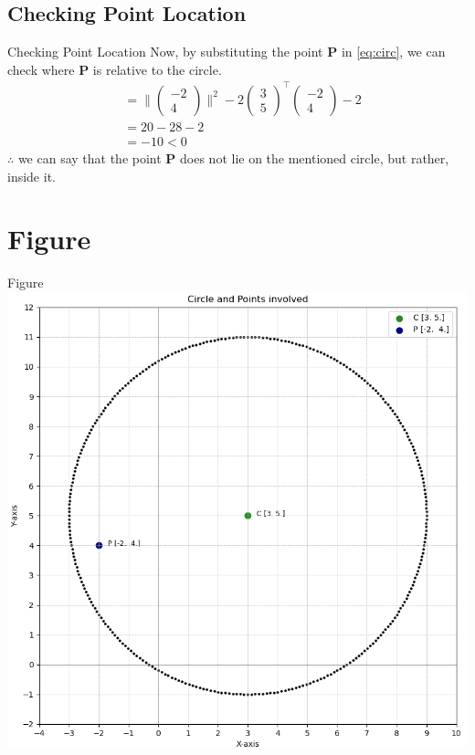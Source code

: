 \documentclass{beamer}
\theoremstyle{remark}
\providecommand{\norm}[1]{\lVert#1\rVert}
\newcommand{\myvec}[1]{\ensuremath{\begin{pmatrix}#1\end{pmatrix}}}
\let\vec\mathbf
\numberwithin{equation}{section}
\begin{document}
\subsection{Checking Point Location}
\begin{frame}{Checking Point Location}
    Now, by substituting the point $\vec{P}$ in \eqref{eq:circ}, we can check where $\vec{P}$ is relative to the circle.
    \begin{align}
        &= \norm{\myvec{-2\\4}}^2-2\myvec{3\\5}^\top\myvec{-2\\4}-2\\
        &= 20-28-2\\
        &= -10 < 0
    \end{align}
    $\therefore$ we can say that the point $\vec{P}$ does not lie on the mentioned circle, but rather, inside it.
\end{frame}

\section{Figure}
\begin{frame}{Figure}
\centering
\includegraphics[height=0.9\textheight]{figs/plot.png}
\end{frame}
\end{document}
